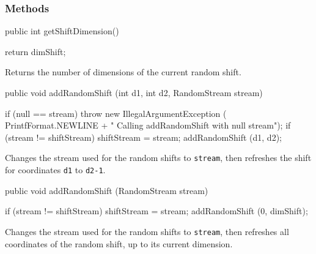 \subsubsection*{Methods}
\begin{code}

   public int getShiftDimension()\begin{hide} {
      return dimShift;
   }\end{hide}
\end{code}
 \begin{tabb}
  Returns the number of dimensions of the current random shift.
 \end{tabb}
\begin{code}

   public void addRandomShift (int d1, int d2, RandomStream stream) \begin{hide} {
      if (null == stream)
         throw new IllegalArgumentException (
              PrintfFormat.NEWLINE +
                  "   Calling addRandomShift with null stream");
      if (stream != shiftStream)
         shiftStream = stream;
      addRandomShift (d1, d2);
   }\end{hide}
\end{code}
 \begin{tabb}
  Changes the stream used for the random shifts to \texttt{stream}, then
  refreshes the shift for coordinates \texttt{d1} to \texttt{d2-1}.
 \end{tabb}
\begin{code}

   public void addRandomShift (RandomStream stream) \begin{hide} {
      if (stream != shiftStream)
         shiftStream = stream;
      addRandomShift (0, dimShift);
   }\end{hide}
\end{code}
 \begin{tabb}
  Changes the stream used for the random shifts to \texttt{stream}, then
  refreshes all coordinates of the random shift, up to its current dimension.
 \end{tabb}
